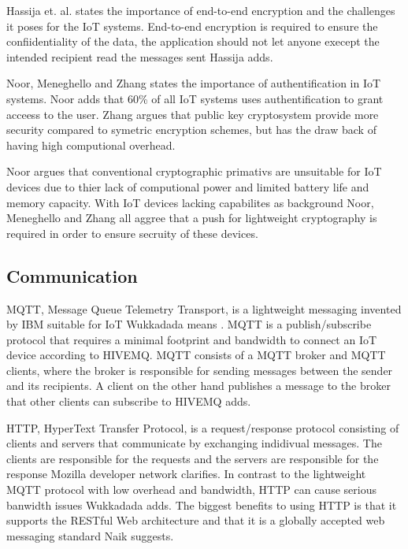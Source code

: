 Hassija et. al. states the importance of end-to-end encryption and the challenges it poses for the IoT systems. 
End-to-end encryption is required to ensure the confiidentiality of the data, the application should not let anyone execept the intended recipient read the messages sent Hassija adds.\cite{Hassija2019}

Noor, Meneghello and Zhang states the importance of authentification in IoT systems. \cite{Noor2019,Meneghello2019,Zhang2014} 
Noor adds that 60\% of all IoT systems uses authentification to grant acceess to the user.  
Zhang argues that public key cryptosystem provide more security compared to symetric encryption schemes, but has the draw back of having high computional overhead. \cite{Zhang2014} 

Noor argues that conventional cryptographic primativs are unsuitable for IoT devices due to thier lack of computional power and limited battery life and memory capacity.
With IoT devices lacking capabilites as background Noor, Meneghello and Zhang all aggree that a push for lightweight cryptography is required in order to ensure secruity of these devices. \cite{Noor2019,Meneghello2019,Zhang2014} 

\subsection{Communication} 
MQTT, Message Queue Telemetry Transport, is a lightweight messaging invented by IBM suitable for IoT Wukkadada means \cite{Wukkadada2018}. 
MQTT is a publish/subscribe protocol that requires a minimal footprint and bandwidth to connect an IoT device according to HIVEMQ. \cite{MQTT2021}
MQTT consists of a MQTT broker and MQTT clients, where the broker is responsible for sending messages between the sender and its recipients. 
A client on the other hand publishes a message to the broker that other clients can subscribe to HIVEMQ adds. \cite{MQTT2021}

HTTP, HyperText Transfer Protocol, is a request/response protocol consisting of clients and servers that communicate by exchanging indidivual messages. 
The clients are responsible for the requests and the servers are responsible for the response Mozilla developer network clarifies. \cite{HTTP2021} 
In contrast to the lightweight MQTT protocol with low overhead and bandwidth, HTTP can cause serious banwidth issues Wukkadada adds. \cite{Wukkadada2018}
The biggest benefits to using HTTP is that it supports the RESTful Web architecture and that it is a globally accepted web messaging standard Naik suggests. \cite{Naik2017} 

